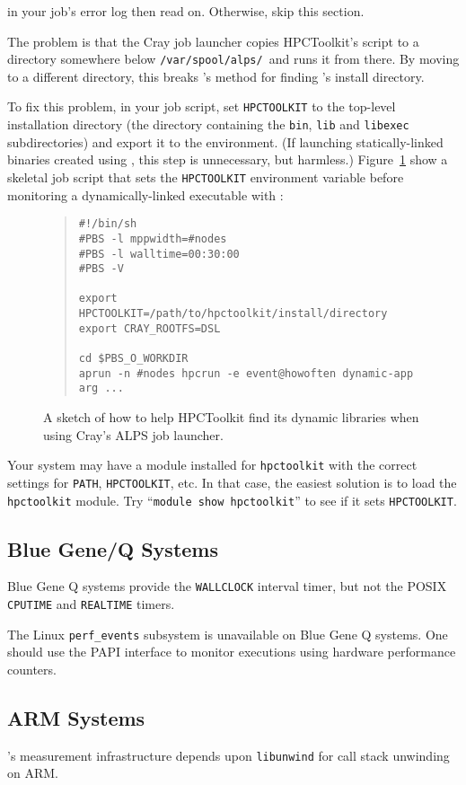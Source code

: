 \noindent 
in your job's error log then read on. Otherwise, skip this section.

The problem is that the Cray job launcher copies HPCToolkit's \hpcrun{}
script to a directory somewhere below \verb|/var/spool/alps/|\ and runs
it from there.  By moving \hpcrun{} to a different directory, this
breaks \hpcrun{}'s method for finding \HPCToolkit{}'s install directory.

To fix this problem, in your job script, set \verb|HPCTOOLKIT| to the top-level \HPCToolkit{} installation directory
(the directory containing the \verb|bin|, \verb|lib| and
\verb|libexec| subdirectories) and export it to the environment.  
(If launching statically-linked binaries created using \hpclink{}, this step is unnecessary, but harmless.)
Figure~\ref{cray-alps} show a skeletal job script that sets the \verb|HPCTOOLKIT| environment variable  before monitoring 
a dynamically-linked executable with \hpcrun{}: 

\begin{figure}
\begin{quote}
\begin{verbatim}
#!/bin/sh
#PBS -l mppwidth=#nodes
#PBS -l walltime=00:30:00
#PBS -V

export HPCTOOLKIT=/path/to/hpctoolkit/install/directory
export CRAY_ROOTFS=DSL

cd $PBS_O_WORKDIR
aprun -n #nodes hpcrun -e event@howoften dynamic-app arg ...
\end{verbatim}
\end{quote}
\caption{A sketch of how to help HPCToolkit find its dynamic libraries when using Cray's ALPS job launcher.} 
\label{cray-alps}
\end{figure}

Your system may have a module installed for \verb|hpctoolkit| with the
correct settings for \verb|PATH|, \verb|HPCTOOLKIT|, etc.  In that case,
the easiest solution is to load the \verb|hpctoolkit| module.  Try
``\verb|module show hpctoolkit|'' to see if it sets \verb|HPCTOOLKIT|.

\subsection{Blue Gene/Q Systems}
Blue Gene Q systems provide the \verb|WALLCLOCK| interval timer, but not the 
POSIX \verb|CPUTIME| and \verb|REALTIME| timers.

The Linux \verb|perf_events| subsystem is unavailable on Blue Gene Q systems. 
One should use the PAPI interface to monitor executions using hardware performance counters. 

\subsection{ARM Systems}
\HPCToolkit{}'s measurement infrastructure depends upon \verb|libunwind| for call stack unwinding on ARM.
